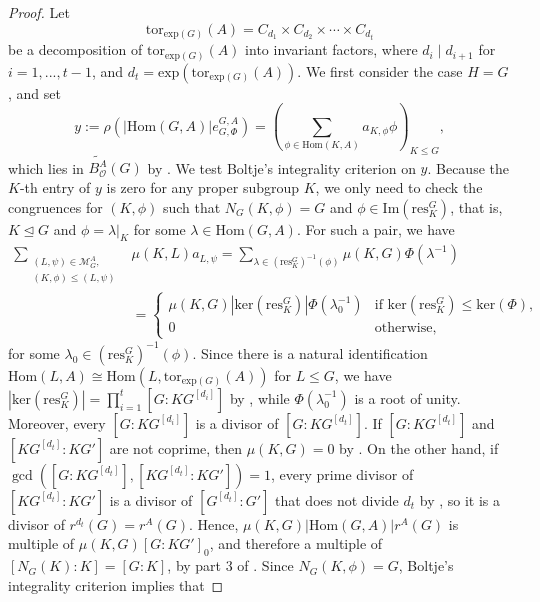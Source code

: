 \documentclass[letterpaper,12pt]{article}
\theoremstyle{plain}
\theoremstyle{definition}
\newcommand{\gBAOG}{\widetilde{B^A_{\mathcal{O}}}(G)}
\newcommand{\MAG}{\mathcal{M}^A_G}
\newcommand{\eGAGPhi}{e^{G,A}_{G,\Phi}}
\begin{document}
\begin{proof}
    Let
    $$\mathrm{tor}_{\mathrm{exp}(G)}(A)=C_{d_1}\times C_{d_2}\times \cdots \times C_{d_t}$$
    be a decomposition of $\mathrm{tor}_{\mathrm{exp}(G)}(A)$ into invariant factors, where $d_i\mid d_{i+1}$ for $i=1,...,t-1$, and $d_t =\mathrm{exp}\left(\mathrm{tor}_{\mathrm{exp}(G)}(A)\right)$. We first consider the case $H=G$, and set
    \[y :=\rho\left(\left|\mathrm{Hom}(G,A)\right|\eGAGPhi\right)=\left(\sum_{\phi\in \mathrm{Hom}(K,A)}a_{K,\phi}\phi\right)_{K\leq G},\]
    which lies in $\gBAOG$ by . We test Boltje's integrality criterion on $y$. Because the $K$-th entry of $y$ is zero for any proper subgroup $K$, we only need to check the congruences for $(K,\phi)$ such that $N_G(K,\phi)=G$ and $\phi\in \mathrm{Im}\left(\mathrm{res}^G_K\right)$, that is, $K\unlhd G$ and $\phi=\lambda|_K$ for some $\lambda \in \mathrm{Hom}(G,A)$. For such a pair, we have
    \begin{align*}
        \sum_{
    \substack{
    (L,\psi)\in \MAG,\\
    (K,\phi)\leq (L,\psi)
    }}
    &\mu(K,L)a_{L,\psi} =\sum_{\lambda\in \left(\text{res}^G_K\right)^{-1}(\phi)}\mu(K,G)\Phi(\lambda^{-1})\\
        &=\begin{cases}
            \mu(K,G){|\mathrm{ker}\left(\mathrm{res}^G_K\right)|}\Phi(\lambda^{-1}_0) &\text{if }\text{ker}\left(\text{res}^G_K\right)\leq \text{ker}(\Phi),\\
            0 &\text{otherwise,}
        \end{cases}
    \end{align*}
    for some $\lambda_0\in \left(\mathrm{res}^G_K\right)^{-1}\left(\phi\right)$. Since there is a natural identification $\mathrm{Hom}(L,A) \cong \mathrm{Hom}\left(L,\mathrm{tor}_{\mathrm{exp}(G)}(A)\right)$ for $L\leq G$, we have $\left|\mathrm{ker}\left(\mathrm{res}^G_K\right)\right|=\prod_{i=1}^t\left[G:KG^{[d_i]}\right]$ by , while $\Phi(\lambda_0^{-1})$ is a root of unity. Moreover, every $\left[G:KG^{[d_i]}\right]$ is a divisor of $\left[G:KG^{[d_t]}\right]$. If $\left[G:KG^{[d_t]}\right]$ and $\left[KG^{[d_t]}:KG'\right]$ are not coprime, then $\mu(K,G)=0$ by . On the other hand, if $\gcd\left(\left[G:KG^{[d_t]}\right],\left[KG^{[d_t]}:KG'\right]\right)=1$, every prime divisor of $\left[KG^{[d_t]}:KG'\right]$ is a divisor of $\left[G^{[d_t]}:G'\right]$ that does not divide $d_t$ by , so it is a divisor of $r^{d_t}(G)=r^A(G)$. Hence, $\mu(K,G)\left|\mathrm{Hom}(G,A)\right|r^A(G)$ is multiple of $\mu(K,G)\left[G:KG'\right]_0$, and therefore a multiple of $[N_G(K):K]=[G:K]$, by part 3 of . Since $N_G(K,\phi)=G$, Boltje's integrality criterion implies that

\end{proof}
\end{document}
